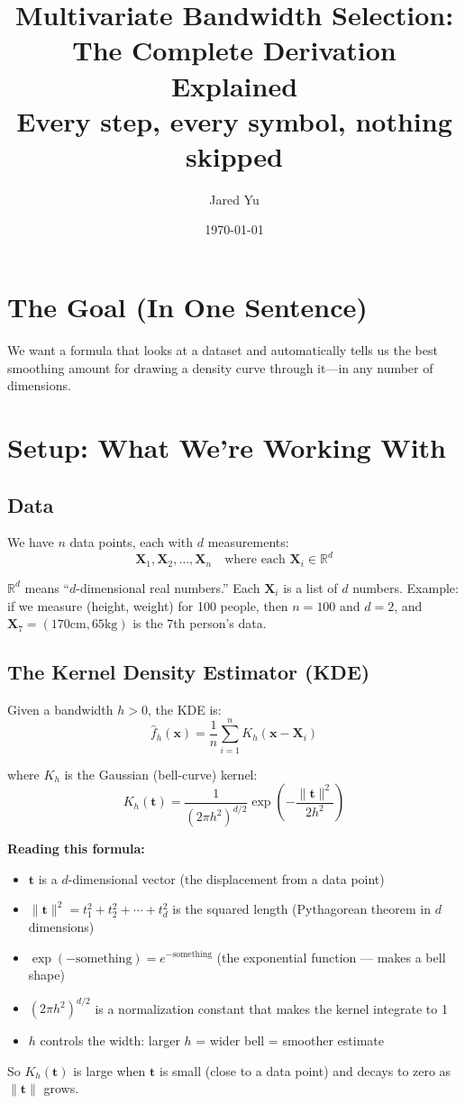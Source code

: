 \documentclass[12pt]{article}
\title{Multivariate Bandwidth Selection:\\The Complete Derivation Explained\\[0.5em]\large Every step, every symbol, nothing skipped}
\author{Jared Yu}
\date{\today}
\newcommand{\note}[1]{\begin{tcolorbox}[colback=yellow!5,colframe=yellow!60!black,breakable]\small #1\end{tcolorbox}}
\begin{document}
\maketitle
\tableofcontents
\newpage

\section{The Goal (In One Sentence)}

We want a formula that looks at a dataset and automatically tells us the best smoothing amount for drawing a density curve through it---in any number of dimensions.

\section{Setup: What We're Working With}

\subsection{Data}

We have $n$ data points, each with $d$ measurements:
$$\mathbf{X}_1, \mathbf{X}_2, \ldots, \mathbf{X}_n \quad\text{where each } \mathbf{X}_i \in \mathbb{R}^d$$

\note{
$\mathbb{R}^d$ means ``$d$-dimensional real numbers.'' Each $\mathbf{X}_i$ is a list of $d$ numbers. Example: if we measure (height, weight) for 100 people, then $n=100$ and $d=2$, and $\mathbf{X}_7 = (170\text{cm}, 65\text{kg})$ is the 7th person's data.}

\subsection{The Kernel Density Estimator (KDE)}

Given a bandwidth $h > 0$, the KDE is:
$$\hat{f}_h(\mathbf{x}) = \frac{1}{n} \sum_{i=1}^n K_h(\mathbf{x} - \mathbf{X}_i)$$

where $K_h$ is the Gaussian (bell-curve) kernel:
$$K_h(\mathbf{t}) = \frac{1}{(2\pi h^2)^{d/2}} \exp\!\left(-\frac{\|\mathbf{t}\|^2}{2h^2}\right)$$

\note{
\textbf{Reading this formula:}
\begin{itemize}
\item $\mathbf{t}$ is a $d$-dimensional vector (the displacement from a data point)
\item $\|\mathbf{t}\|^2 = t_1^2 + t_2^2 + \cdots + t_d^2$ is the squared length (Pythagorean theorem in $d$ dimensions)
\item $\exp(-\text{something}) = e^{-\text{something}}$ (the exponential function --- makes a bell shape)
\item $(2\pi h^2)^{d/2}$ is a normalization constant that makes the kernel integrate to 1
\item $h$ controls the width: larger $h$ = wider bell = smoother estimate
\end{itemize}
So $K_h(\mathbf{t})$ is large when $\mathbf{t}$ is small (close to a data point) and decays to zero as $\|\mathbf{t}\|$ grows.}
\end{document}
